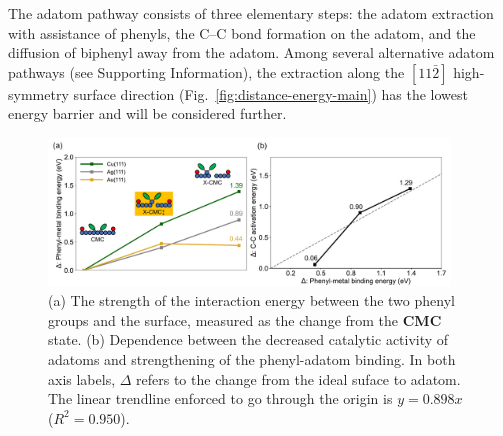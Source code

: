 \documentclass[aps,prb,amsmath,amssymb,11pt]{revtex4-1}
\newcommand{\sinfo}{Supporting Information}
\newcommand{\zhzh}{\color{black}}
\renewcommand{\sout}[1]{\unskip}
\begin{document}
The adatom pathway consists of three elementary steps: the adatom extraction with {\zhzh assistance of phenyls}, the C--C bond formation on the adatom, and the diffusion of biphenyl away from the adatom. 
\sout{The adatom extraction was considered along the two high-symmetry surface directions $[1\bar{1}0]$ and $[11\bar{2}]$ (Fig. \ref{fig:distance-energy-main}) and the product of the extraction -- an adatom bonded to two phenyl radicals -- is denoted \textbf{X-CMC}, where \textbf{X} refers to the presence of eXtracted adatom in this and other state labels. 
The higher stability of the $[1\bar{1}0]$ \textbf{X-CMC} state is most likely due to the stronger interaction between the undercoordinated metal atoms at the vacancy edges and the nearby phenyl ring (Figure~\ref{fig:distance-energy-main}).
However, the extraction along the $[11\bar{2}]$ direction has lower barrier than that along the $[1\bar{1}0]$ direction (0.71~eV \emph{vs} 1.38~eV) because the adatom does not have to be lifted as high in the \textbf{X-CMC$\ddagger$} transition state in the former case (1.58\AA\ \emph{vs} 1.68\AA, Table~\ref{SI-table:adatom-longitude}). This difference in the barrier height is significant enough to consider only the $[11\bar{2}]$ extraction further.}
%
{\zhzh Among several alternative adatom pathways (see \sinfo), the extraction along the $[11\bar{2}]$ high-symmetry surface direction (Fig.~\ref{fig:distance-energy-main}) has the lowest energy barrier and will be considered further.}

\begin{figure}[bt]
\centering
\includegraphics[width=0.95\textwidth]{Fig/onlysurface.pdf}
\caption{
(a) The strength of the interaction energy between the two phenyl groups and the surface, measured as the change from the \textbf{CMC} state. (b) Dependence between the decreased catalytic activity of adatoms and strengthening of the phenyl-adatom binding. In both axis labels, $\Delta$ refers to the change from the ideal suface to adatom. The linear trendline enforced to go through the origin is $y=0.898 x$ ($R^2 = 0.950$).}
\label{fig:onlysurface}
\end{figure}
\end{document}

